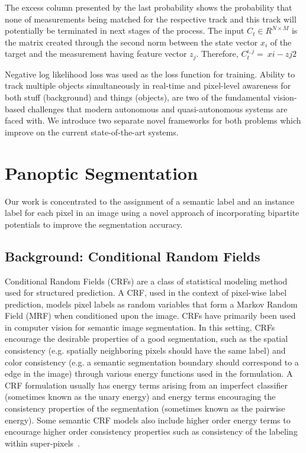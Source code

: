The excess column presented by the last probability shows the probability that none of measurements being matched for the respective track and this track will potentially be terminated in next stages of the process.
The input $C_t\in R^{N\times M}$ is the matrix created through the second norm between the state vector $x_i$ of the target and the measurement having feature vector $z_j$.
Therefore, $C_t^{i,j}=\ xi-zj2
$

Negative log likelihood loss was used as the loss function for training. Ability to track multiple objects simultaneously in real-time and pixel-level awareness for both stuff (background) and things (objects), are two of the fundamental vision-based challenges that modern autonomous and quasi-autonomous systems are faced with. We introduce two separate novel frameworks for both problems which improve on the current state-of-the-art systems.


\section{Panoptic Segmentation}
Our work is concentrated to the assignment of a semantic label and an instance label for each pixel in an image using a novel approach of incorporating bipartite potentials to improve the segmentation accuracy.

\subsection{Background: Conditional Random Fields}

Conditional Random Fields (CRFs) are a class of statistical modeling method used for structured prediction. A CRF, used in the context of pixel-wise label prediction, models pixel labels as random variables that form a Markov Random Field (MRF) when conditioned upon the image. CRFs have primarily been used in computer vision for semantic image segmentation. In this setting, CRFs encourage the desirable properties of a good segmentation, such as the spatial consistency (e.g. spatially neighboring pixels should have the same label) and color consistency (e.g. a semantic segmentation boundary should correspond to a edge in the image) through various energy functions used in the formulation. A CRF formulation usually has energy terms arising from an imperfect classifier (sometimes known as the unary energy) and energy terms encouraging the consistency properties of the segmentation (sometimes known as the pairwise energy). Some semantic CRF models also include higher order energy terms to encourage higher order consistency properties such as consistency of the labeling within super-pixels~\cite{arnab_eccv_2016}.

